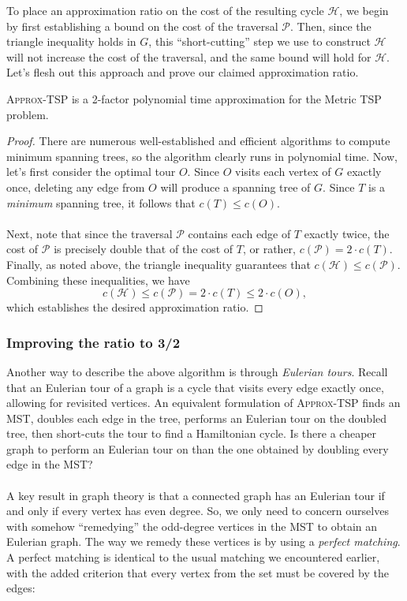 \documentclass{article}
\newenvironment{theorem}[2][Theorem]{\begin{trivlist}
\item[\hskip \labelsep {\bfseries #1}\hskip \labelsep {\bfseries #2.}]}{\end{trivlist}}
\begin{document}
\noindent To place an approximation ratio on the cost of the resulting cycle $\mathcal{H}$, we begin by first establishing a bound on the cost of the traversal $\mathcal{P}$. Then, since the triangle inequality holds in $G$, this ``short-cutting'' step we use to construct $\mathcal{H}$ will not increase the cost of the traversal, and the same bound will hold for $\mathcal{H}$. Let's flesh out this approach and prove our claimed approximation ratio.

\begin{theorem}{3.1}{}
    \textsc{Approx-TSP} is a 2-factor polynomial time approximation for the Metric TSP problem.

    \begin{proof}
        There are numerous well-established and efficient algorithms to compute minimum spanning trees, so the algorithm clearly runs in polynomial time. Now, let's first consider the optimal tour $O$. Since $O$ visits each vertex of $G$ exactly once, deleting any edge from $O$ will produce a spanning tree of $G$. Since $T$ is a \textit{minimum} spanning tree, it follows that $c(T) \leq c(O)$.\\
        \\
        Next, note that since the traversal $\mathcal{P}$ contains each edge of $T$ exactly twice, the cost of $\mathcal{P}$ is precisely double that of the cost of $T$, or rather, $c(\mathcal{P}) = 2 \cdot c(T)$. Finally, as noted above, the triangle inequality guarantees that $c(\mathcal{H}) \leq c(\mathcal{P})$. Combining these inequalities, we have 
        \[
        c(\mathcal{H}) \leq c(\mathcal{P}) = 2 \cdot c(T) \leq 2 \cdot c(O),
        \]
        which establishes the desired approximation ratio.
    \end{proof}
\end{theorem}

\subsubsection{Improving the ratio to 3/2}

\noindent Another way to describe the above algorithm is through \textit{Eulerian tours}. Recall that an Eulerian tour of a graph is a cycle that visits every edge exactly once, allowing for revisited vertices. An equivalent formulation of \textsc{Approx-TSP} finds an MST, doubles each edge in the tree, performs an Eulerian tour on the doubled tree, then short-cuts the tour to find a Hamiltonian cycle. Is there a cheaper graph to perform an Eulerian tour on than the one obtained by doubling every edge in the MST?\\
\\
A key result in graph theory is that a connected graph has an Eulerian tour if and only if every vertex has even degree. So, we only need to concern ourselves with somehow ``remedying'' the odd-degree vertices in the MST to obtain an Eulerian graph. The way we remedy these vertices is by using a \textit{perfect matching}. A perfect matching is identical to the usual matching we encountered earlier, with the added criterion that every vertex from the set must be covered by the edges:
\end{document}
